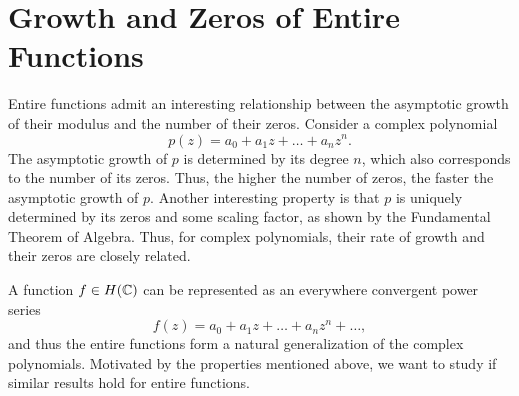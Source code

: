 \chapter{Growth and Zeros of Entire Functions}
\label{ch:growth-zeros-entire-functions}

Entire functions admit an interesting relationship between the asymptotic growth of their modulus and the number of their zeros. Consider a complex polynomial
$$ p(z) = a_0 + a_1 z + \hdots + a_n z^n. $$
The asymptotic growth of $p$ is determined by its degree $n$, which also corresponds to the number of its zeros. Thus, the higher the number of zeros, the faster the asymptotic growth of $p$. Another interesting property is that $p$ is uniquely determined by its zeros and some scaling factor, as shown by the Fundamental Theorem of Algebra. Thus, for complex polynomials, their rate of growth and their zeros are closely related.

A function $f \in H(\mathbb{C})$ can be represented as an everywhere convergent power series
$$ f(z) = a_0 + a_1 z + \hdots + a_n z^n + \hdots, $$
and thus the entire functions form a natural generalization of the complex polynomials. Motivated by the properties mentioned above, we want to study if similar results hold for entire functions.




